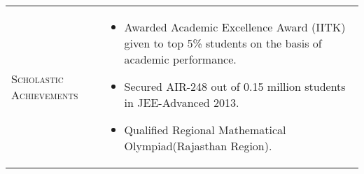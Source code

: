 \documentclass[a4paper]{article}
\begin{document}
\vspace{-3em}
\centering
\begin{longtable}{@{}m{3.0cm}m{14cm}@{}}

  \textrm{\textsc {Scholastic Achievements}} & 
                                               \begin{itemize} \itemsep -2pt
                                               \item
                                                 Awarded Academic Excellence Award (IITK) given to top 5\% students on the basis of academic performance.
                                               \item
                                                 Secured AIR-248 out of 0.15 million students in JEE-Advanced 2013.
                                               \item
                                                 Qualified Regional Mathematical Olympiad(Rajasthan Region).
                                               \end{itemize}

\\


\end{longtable}
\end{document}
